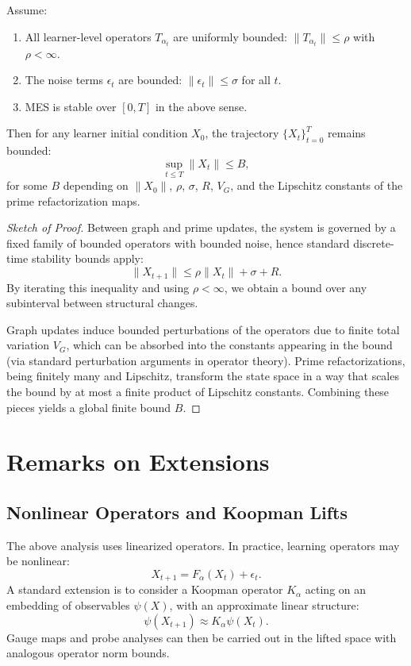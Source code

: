 \documentclass[11pt]{article}
\begin{document}
\begin{theorem}
Assume:
\begin{enumerate}
  \item All learner-level operators $T_{\alpha_t}$ are uniformly bounded: $\|T_{\alpha_t}\| \le \rho$ with $\rho < \infty$.
  \item The noise terms $\epsilon_t$ are bounded: $\|\epsilon_t\| \le \sigma$ for all $t$.
  \item MES is stable over $[0,T]$ in the above sense.
\end{enumerate}
Then for any learner initial condition $X_0$, the trajectory $\{X_t\}_{t=0}^T$ remains bounded:
\[
  \sup_{t \le T} \|X_t\| \le B,
\]
for some $B$ depending on $\|X_0\|$, $\rho$, $\sigma$, $R$, $V_G$, and the Lipschitz constants of the prime refactorization maps.
\end{theorem}

\begin{proof}[Sketch of Proof]
Between graph and prime updates, the system is governed by a fixed family of bounded operators with bounded noise, hence standard discrete-time stability bounds apply:
\[
  \|X_{t+1}\| \le \rho \|X_t\| + \sigma + R.
\]
By iterating this inequality and using $\rho < \infty$, we obtain a bound over any subinterval between structural changes.

Graph updates induce bounded perturbations of the operators due to finite total variation $V_G$, which can be absorbed into the constants appearing in the bound (via standard perturbation arguments in operator theory). Prime refactorizations, being finitely many and Lipschitz, transform the state space in a way that scales the bound by at most a finite product of Lipschitz constants. Combining these pieces yields a global finite bound $B$.
\end{proof}

\section{Remarks on Extensions}

\subsection{Nonlinear Operators and Koopman Lifts}

The above analysis uses linearized operators. In practice, learning operators may be nonlinear:
\[
  X_{t+1} = F_\alpha(X_t) + \epsilon_t.
\]
A standard extension is to consider a Koopman operator $K_\alpha$ acting on an embedding of observables $\psi(X)$, with an approximate linear structure:
\[
  \psi(X_{t+1}) \approx K_\alpha \psi(X_t).
\]
Gauge maps and probe analyses can then be carried out in the lifted space with analogous operator norm bounds.
\end{document}
